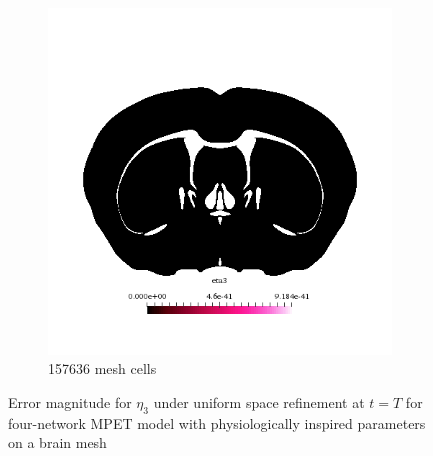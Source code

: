 \begin{figure}[h!]
\begin{subfigure}[b]{0.49\textwidth}
    \includegraphics[width=\textwidth,height=\textheight,keepaspectratio,height=\textheight,keepaspectratio]{figures/4_mpet/biomedical/space/eta3_2.png}
    \caption{157636 mesh cells}
  \end{subfigure}
  \caption{Error magnitude for $\eta_3$ under uniform space refinement at $t=T$ for four-network MPET model with physiologically inspired parameters on a brain mesh} \label{fig:mpet4_eta3}
\end{figure}

